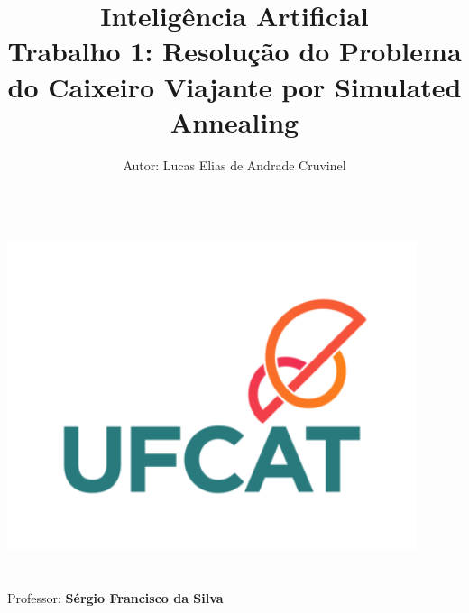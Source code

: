 \title{\Large Inteligência Artificial \\[0.5cm]
        \bf\Large Trabalho 1: Resolução do Problema do Caixeiro Viajante por Simulated Annealing}
\author{\large Autor: Lucas Elias de Andrade Cruvinel\\ \ \\}

\makeatletter
    \begin{titlepage}
        \begin{center}
	   { \includegraphics[width=12cm]{UFCAT_-_Identidade_Visual_Original.png}}
	   {\ \\ \ \\}
        \vbox{}\vspace{5cm}
            {\@title }\\[3cm] 
            {\@author}
            {\large Professor: \bf Sérgio Francisco da Silva\\ \ \\}

        \end{center}
    \end{titlepage}
\makeatother